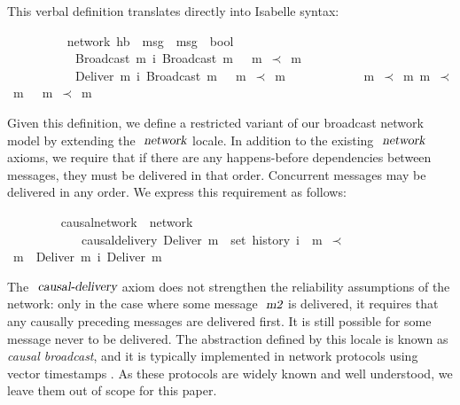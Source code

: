 This verbal definition translates directly into Isabelle syntax:
\vspace{0.375em}
\begin{isabellebody}
\ \ \ \ \ \ \ \  {\isacharparenleft}\ network{\isacharparenright}\ hb\ {\isacharcolon}{\isacharcolon}\ {\isachardoublequoteopen}{\isacharprime}msg\ {\isasymRightarrow}\ {\isacharprime}msg\ {\isasymRightarrow}\ bool{\isachardoublequoteclose}\ \isanewline
\ \ \ \ \ \ \ \ \ \ {\isachardoublequoteopen}{\isasymlbrakk}\ Broadcast\ m{}\ {\isasymsqsubset}\isactrlsup i\ Broadcast\ m{}\ {\isasymrbrakk}\ {\isasymLongrightarrow}\ m{}\ $\prec$\ m{}{\isachardoublequoteclose}\ {\isacharbar}\isanewline
\ \ \ \ \ \ \ \ \ \ {\isachardoublequoteopen}{\isasymlbrakk}\ Deliver\ m{}\ {\isasymsqsubset}\isactrlsup i\ Broadcast\ m{}\ {\isasymrbrakk}\ {\isasymLongrightarrow}\ m{}\ $\prec$\ m{}{\isachardoublequoteclose}\ {\isacharbar}\isanewline
\ \ \ \ \ \ \ \ \ \ {\isachardoublequoteopen}{\isasymlbrakk}\ m{}\ $\prec$\  m{}{\isacharsemicolon}\ m{}\ $\prec$\ m{}\ {\isasymrbrakk}\ {\isasymLongrightarrow}\ m{}\ $\prec$\ m{}{\isachardoublequoteclose}
\end{isabellebody}
\vspace{0.375em}
Given this definition, we define a restricted variant of our broadcast network model by extending the $\isa{network}$ locale.
In addition to the existing $\isa{network}$ axioms, we require that if there are any happens-before dependencies between messages, they must be delivered in that order.
Concurrent messages may be delivered in any order.
We express this requirement as follows:
\vspace{0.375em}
\begin{isabellebody}
\ \ \ \ \ \ \ \  causal{\isacharunderscore}network\ {\isacharequal}\ network\ {\isacharplus}\isanewline
\ \ \ \ \ \ \ \ \ \ \ \ causal{\isacharunderscore}delivery{\isacharcolon}\ {\isachardoublequoteopen}Deliver\ m{}\ {\isasymin}\ set\ {\isacharparenleft}history\ i{\isacharparenright}\ {\isasymLongrightarrow}\ m{}\ $\prec$\ m{}\ {\isasymLongrightarrow}\ Deliver\ m{}\ {\isasymsqsubset}\isactrlsup i\ Deliver\ m{}{\isachardoublequoteclose}
\end{isabellebody}
\vspace{0.375em}
The $\isa{causal-delivery}$ axiom does not strengthen the reliability assumptions of the network: only in the case where some message $\isa{m2}$ is delivered, it requires that any causally preceding messages are delivered first.
It is still possible for some message never to be delivered.
The abstraction defined by this locale is known as \emph{causal broadcast}, and it is typically implemented in network protocols using vector timestamps \cite{Schwarz:1994gl,Fidge:1988tv,Raynal:1996jl}.
As these protocols are widely known and well understood, we leave them out of scope for this paper.

